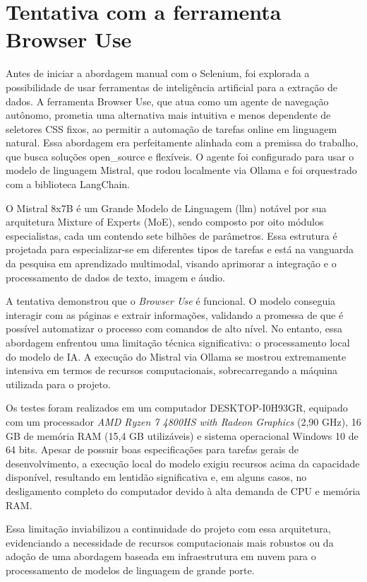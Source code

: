 \section{Tentativa com a ferramenta Browser Use}

Antes de iniciar a abordagem manual com o Selenium, foi explorada a possibilidade de usar ferramentas de inteligência artificial para a extração de dados. A ferramenta Browser Use, que atua como um agente de navegação autônomo, prometia uma alternativa mais intuitiva e menos dependente de seletores CSS fixos, ao permitir a automação de tarefas online em linguagem natural. Essa abordagem era perfeitamente alinhada com a premissa do trabalho, que busca soluções \acs{open_source} e flexíveis. O agente foi configurado para usar o modelo de linguagem Mistral, que rodou localmente via Ollama e foi orquestrado com a biblioteca LangChain.

O Mistral 8x7B é um Grande Modelo de Linguagem (\ac{llm}) notável por sua arquitetura Mixture of Experts (MoE), sendo composto por oito módulos especialistas, cada um contendo sete bilhões de parâmetros. Essa estrutura é projetada para especializar-se em diferentes tipos de tarefas e está na vanguarda da pesquisa em aprendizado multimodal, visando aprimorar a integração e o processamento de dados de texto, imagem e áudio.

A tentativa demonstrou que o \textit{Browser Use} é funcional. O modelo conseguia interagir com as páginas e extrair informações, validando a promessa de que é possível automatizar o processo com comandos de alto nível. No entanto, essa abordagem enfrentou uma limitação técnica significativa: o processamento local do modelo de IA. A execução do Mistral via Ollama se mostrou extremamente intensiva em termos de recursos computacionais, sobrecarregando a máquina utilizada para o projeto.

Os testes foram realizados em um computador DESKTOP-I0H93GR, equipado com um processador \textit{AMD Ryzen 7 4800HS with Radeon Graphics} (2,90 GHz), 16 GB de memória RAM (15,4 GB utilizáveis) e sistema operacional Windows 10 de 64 bits. Apesar de possuir boas especificações para tarefas gerais de desenvolvimento, a execução local do modelo exigiu recursos acima da capacidade disponível, resultando em lentidão significativa e, em alguns casos, no desligamento completo do computador devido à alta demanda de CPU e memória RAM.

Essa limitação inviabilizou a continuidade do projeto com essa arquitetura, evidenciando a necessidade de recursos computacionais mais robustos ou da adoção de uma abordagem baseada em infraestrutura em nuvem para o processamento de modelos de linguagem de grande porte.

